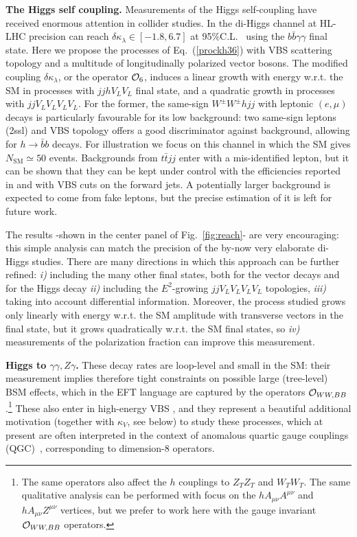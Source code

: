 \vspace{5mm}
\noindent
{\bf The Higgs self coupling.}
Measurements of the Higgs self-coupling have received enormous attention in collider studies.  In the di-Higgs channel at HL-LHC precision can reach $\delta\kappa_\lambda\in[-1.8,6.7]$ at 95\%C.L.~\cite{ATL-PHYS-PUB-2017-001} using the $b\bar{b}\gamma\gamma$ final state. 
Here we propose the processes of Eq.~(\ref{prockh36}) with VBS scattering topology and a  multitude of longitudinally polarized vector bosons.
The modified coupling $\delta \kappa_\lambda$, or the operator $\mathcal{O}_6$, induces a linear growth  with energy w.r.t. the SM in processes with $jj h V_LV_L $ final state, and a quadratic growth in processes with  $jj V_LV_LV_LV_L$. For the former, the same-sign $W^\pm W^\pm h jj$  with leptonic $(e,\mu)$ decays is particularly favourable for its low background: two same-sign leptons (2ssl) and VBS topology offers a good discriminator against background, allowing for $h\to\bar b b$ decays. For illustration we focus on this channel in which the SM gives $N_{\textrm{SM}}\simeq 50$ events. {Backgrounds from $ t \bar t jj$ enter with a mis-identified lepton, but it can be shown that they can be kept under control with the efficiencies reported in \cite{Khachatryan:2015hwa} and with VBS cuts on the forward jets. A potentially larger background is expected to come from fake leptons, but the precise estimation of it is left for future work.}


The results -shown in the center panel of Fig.~\ref{fig:reach}- are very encouraging: this simple analysis can match the precision of the by-now very elaborate di-Higgs studies.
There are many directions in which this approach can be further refined: \emph{i)} including the  many other final states, both for the vector decays and for the Higgs decay \emph{ii)} including the  $E^2$-growing $jj V_LV_LV_LV_L$ topologies, \emph{iii)} taking into account differential information.
Moreover, the process studied grows only linearly with energy w.r.t. the SM amplitude with transverse vectors in the final state, but it grows quadratically w.r.t. the SM final states, so \emph{iv)} measurements of the polarization fraction can improve this measurement.



\vspace{5mm}
\noindent
{\bf Higgs to $\gamma\gamma,Z\gamma$.}
These decay rates are loop-level and small in the SM: their measurement implies therefore  tight constraints on possible large (tree-level) BSM effects, which in the EFT language are captured by the operators $\mathcal{O}_{WW,BB}$.\footnote{The same operators also affect the  $h$ couplings to $Z_TZ_T$ and $W_TW_T$. The same qualitative analysis can be performed with focus on the $hA_{\mu\nu}A^{\mu\nu}$ and  $hA_{\mu\nu}Z^{\mu\nu}$ vertices, but we prefer to work here with the gauge invariant $\mathcal{O}_{WW,BB}$ operators.}
These also enter in high-energy VBS , and they represent a beautiful additional motivation (together with $\kappa_V$, see below) to study these processes, which at present are often interpreted in the context of anomalous quartic gauge couplings (QGC)~\cite{Eboli:2006wa}, corresponding to dimension-8 operators.

